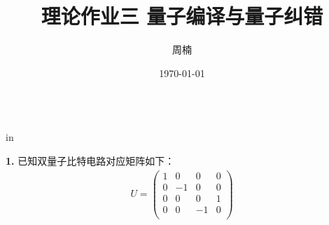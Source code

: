 \documentclass[11pt]{article}
\begin{document}
\title{{\bf 理论作业三 \quad 量子编译与量子纠错}}
\author{周楠 }
\date{\today}
\maketitle

\begin{tabular*}{13cm}{r}
\hline
\end{tabular*}

 in

{\bf 1.} 已知双量子比特电路对应矩阵如下：
\begin{align*}
    U = \begin{pmatrix}
    1 & 0 & 0 & 0 \\
    0 & -1 & 0 & 0 \\
    0 & 0 & 0 & 1 \\
    0 & 0 & -1 & 0 \\
    \end{pmatrix}
\end{align*}
\end{document}
